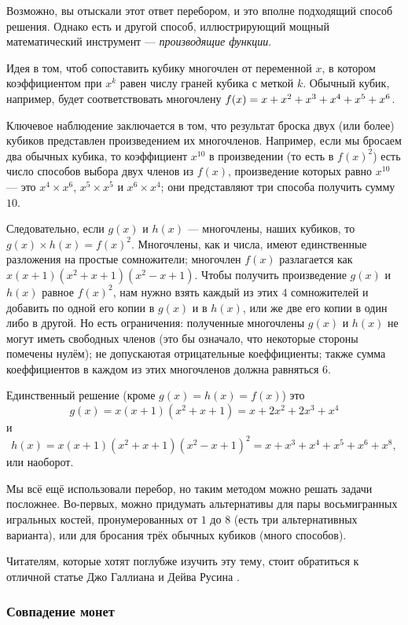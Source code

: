 Возможно, вы отыскали этот ответ перебором, и это вполне подходящий способ решения.
Однако есть и другой способ, иллюстрирующий мощный математический инструмент --- \emph{производящие функции}.

Идея в том, чтоб сопоставить кубику многочлен от переменной $x$, в котором коэффициентом при $x^k$ равен числу граней кубика с меткой $k$.
Обычный кубик, например, будет соответствовать многочлену $f(x) = x \z+ x^2 \z+ x^3 \z+ x^4 \z+ x^5 \z+ x^6$.

Ключевое наблюдение заключается в том, что результат броска двух (или более) кубиков представлен произведением их многочленов.
Например, если мы бросаем два обычных кубика, то коэффициент $x^{10}$ в произведении (то есть в $f(x)^2$) есть число способов выбора двух членов из $f(x)$, произведение которых равно $x^{10}$ ---
это $x^4 \times x^6$, $x^5 \times x^5$ и $x^6 \times x^4$; они представляют три способа получить сумму $10$.

Следовательно, если $g(x)$ и $h(x)$ --- многочлены, наших кубиков, то $g(x) \times h(x) = f(x)^2$.
Многочлены, как и числа, имеют единственные разложения на простые сомножители;
многочлен $f(x)$ разлагается как $x(x + 1)(x^2 + x + 1)(x^2 - x + 1)$.
Чтобы получить произведение $g(x)$ и $h(x)$ равное $f(x)^2$, нам нужно взять каждый из этих $4$ сомножителей и добавить по одной его копии в $g(x)$ и в $h(x)$, или же две его копии в один либо в другой.
Но есть ограничения:
полученные многочлены $g(x)$ и $h(x)$ не могут иметь свободных членов (это бы означало, что некоторые стороны помечены нулём);
не допускаютая отрицательные коеффициенты;
также сумма коеффициентов в каждом из этих многочленов должна равняться 6.


Единственный решение (кроме $g(x) = h(x) = f(x)$) это
\[g(x)
=
x(x + 1)(x^2 + x + 1)
=
x + 2x^2 + 2x^3 + x^4\]
и
\[h(x)
=
x(x + 1)(x^2 + x + 1)(x^2 - x + 1)^2
=
x + x^3 + x^4 + x^5 + x^6 + x^8,\]
или наоборот.

Мы всё ещё использовали перебор, но таким методом можно решать задачи посложнее.
Во-первых, можно придумать альтернативы для пары восьмигранных игральных костей, пронумерованных от $1$ до $8$ (есть три альтернативных варианта), или для бросания трёх обычных кубиков (много способов).

Читателям, которые хотят поглубже изучить эту тему, стоит обратиться к отличной статье Джо Галлиана и Дейва Русина \cite{gallian-rusin}.


\subsubsection*{Совпадение монет}

